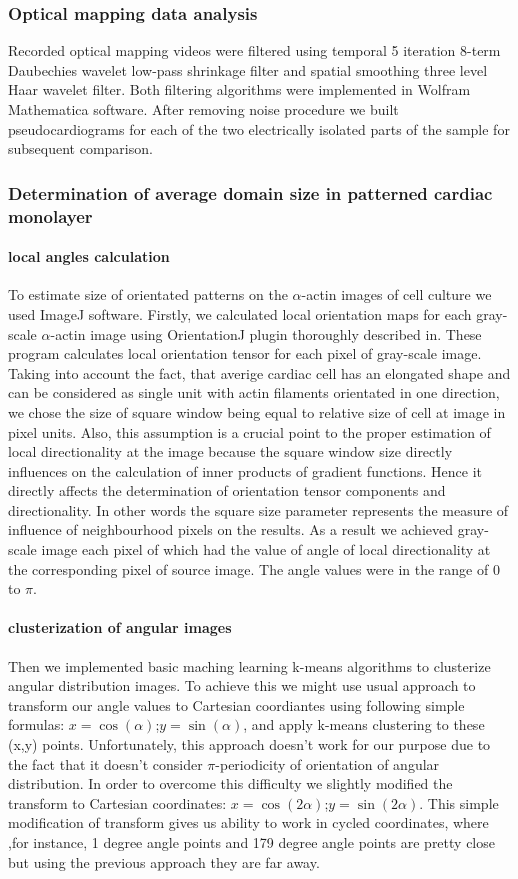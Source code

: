 \subsubsection{Optical mapping data analysis}
Recorded optical mapping videos were filtered using temporal 5 iteration 8-term Daubechies wavelet low-pass shrinkage filter and spatial smoothing three level Haar wavelet filter. Both filtering algorithms were implemented in Wolfram Mathematica software. After removing noise procedure we built pseudocardiograms for each of the two electrically isolated parts of the sample for subsequent comparison. 
\subsubsection{Determination of average domain size in patterned cardiac monolayer}  
\paragraph{local angles calculation}
To estimate size of orientated patterns on the $\alpha$-actin images of cell culture we used ImageJ software. Firstly, we calculated local orientation maps for each gray-scale $\alpha$-actin image using OrientationJ plugin thoroughly described in\cite{Bouten2011}. These program calculates local orientation tensor for each pixel of gray-scale image. Taking into account the fact, that averige cardiac cell has an elongated shape and can be considered as single unit with actin filaments orientated in one direction, we chose the size of square window being equal to relative size of cell at image in pixel units. Also, this assumption is a crucial point to the proper estimation of local directionality at the image because the square window size directly influences on the calculation of inner products of gradient functions. Hence it directly affects the determination of orientation tensor components and directionality. In other words the square size parameter represents the measure of influence of neighbourhood pixels on the results.    As a result we achieved gray-scale image each pixel of which had the value of angle of local directionality at the corresponding pixel of source image. The angle values were in the range of 0 to $\pi$.      
\paragraph{clusterization of angular images}
Then we implemented basic maching learning k-means algorithms to clusterize angular distribution images. To achieve this we might use usual approach to transform our angle values to Cartesian coordiantes using following simple formulas:
$x=\cos(\alpha)$;$y=\sin(\alpha)$, and apply k-means clustering to these (x,y) points. Unfortunately, this approach doesn't work for our purpose due to the fact that it doesn't consider $\pi$-periodicity of orientation of angular distribution. In order to overcome this difficulty we slightly modified the transform to Cartesian coordinates: $x=\cos(2\alpha)$;$y=\sin(2\alpha)$. This simple modification of transform gives us ability to work in cycled coordinates, where ,for instance, 1 degree angle points and 179 degree angle points are pretty close but using the previous approach they are far away.     
